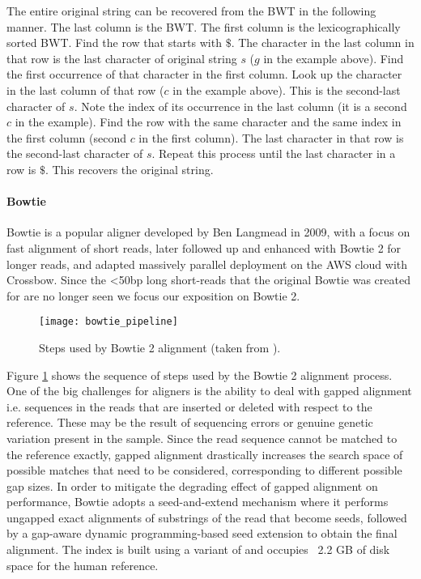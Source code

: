 The entire original string can be recovered from the BWT in the following manner. The last column is the BWT. The first column is the lexicographically sorted BWT. Find the row that starts with $\$$. The character in the last column in that row is the last character of original string $s$ ($g$ in the example above). Find the first occurrence of that character in the first column. Look up the character in the last column of that row ($c$ in the example above). This is the second-last character of $s$. Note the index of its occurrence in the last column (it is a second $c$ in the example). Find the row with the same character and the same index in the first column (second $c$ in the first column). The last character in that row is the second-last character of $s$. Repeat this process until the last character in a row is $\$$. This recovers the original string.
\clearpage 
\paragraph{Bowtie}

Bowtie is a popular aligner developed by Ben Langmead in 2009, with a focus on fast alignment of short reads\autocite{langmead2009ultrafast}, later followed up and enhanced with Bowtie 2 for longer reads\autocite{langmead2012fast}, and adapted massively parallel deployment on the AWS cloud with Crossbow\autocite{langmead2009searching}. Since the <50bp long short-reads that the original Bowtie was created for are no longer seen we focus our exposition on Bowtie 2.

\begin{figure}[h!]
    \texttt{[image: bowtie\_pipeline]}
    \centering
    \caption {Steps used by Bowtie 2 alignment (taken from \autocite{langmead2012fast}).}
    \label{fig:bowtie_pipeline}
\end{figure}

Figure \ref{fig:bowtie_pipeline} shows the sequence of steps used by the Bowtie 2 alignment process. One of the big challenges for aligners is the ability to deal with gapped alignment i.e. sequences in the reads that are inserted or deleted with respect to the reference. These may be the result of sequencing errors or genuine genetic variation present in the sample. Since the read sequence cannot be matched to the reference exactly, gapped alignment drastically increases the search space of possible matches that need to be considered, corresponding to different possible gap sizes. In order to mitigate the degrading effect of gapped alignment on performance, Bowtie adopts a seed-and-extend mechanism where it performs ungapped exact alignments of substrings of the read that become seeds, followed by a gap-aware dynamic programming-based seed extension to obtain the final alignment. The index is built using a variant of \autocite{karkkainen2003simple} and occupies ~2.2 GB of disk space for the human reference.

